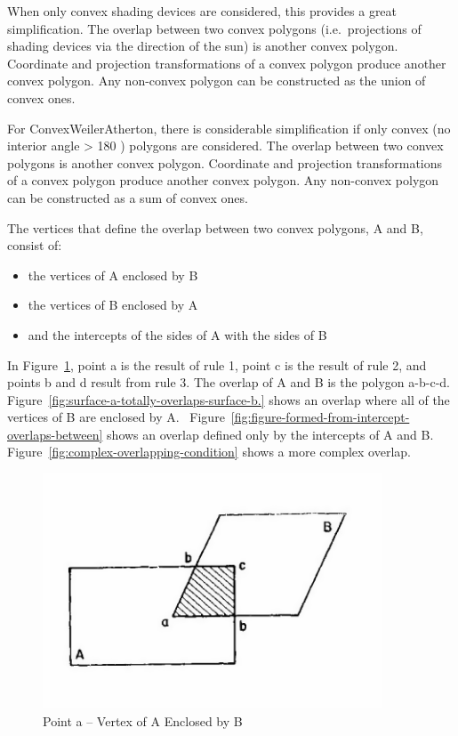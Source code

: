 When only convex shading devices are considered, this provides a great simplification. The overlap between two convex polygons (i.e.~projections of shading devices via the direction of the sun) is another convex polygon. Coordinate and projection transformations of a convex polygon produce another convex polygon. Any non-convex polygon can be constructed as the union of convex ones.

For ConvexWeilerAtherton, there is considerable simplification if only convex (no interior angle \textgreater{} 180 ) polygons are considered. The overlap between two convex polygons is another convex polygon. Coordinate and projection transformations of a convex polygon produce another convex polygon. Any non-convex polygon can be constructed as a sum of convex ones.

The vertices that define the overlap between two convex polygons, A and B, consist of:

\begin{itemize}
\item
  the vertices of A enclosed by B
\item
  the vertices of B enclosed by A
\item
  and the intercepts of the sides of A with the sides of B
\end{itemize}

In Figure~\ref{fig:point-a-vertex-of-a-enclosed-by-b}, point a is the result of rule 1, point c is the result of rule 2, and points b and d result from rule 3. The overlap of A and B is the polygon a-b-c-d. Figure~\ref{fig:surface-a-totally-overlaps-surface-b.} shows an overlap where all of the vertices of B are enclosed by A.~ Figure~\ref{fig:figure-formed-from-intercept-overlaps-between} shows an overlap defined only by the intercepts of A and B. Figure~\ref{fig:complex-overlapping-condition} shows a more complex overlap.

\begin{figure}[hbtp] %
\centering
\includegraphics[width=0.9\textwidth, height=0.9\textheight, keepaspectratio=true]{media/image637.png}
\caption{Point a – Vertex of A Enclosed by B \protect \label{fig:point-a-vertex-of-a-enclosed-by-b}}
\end{figure}

